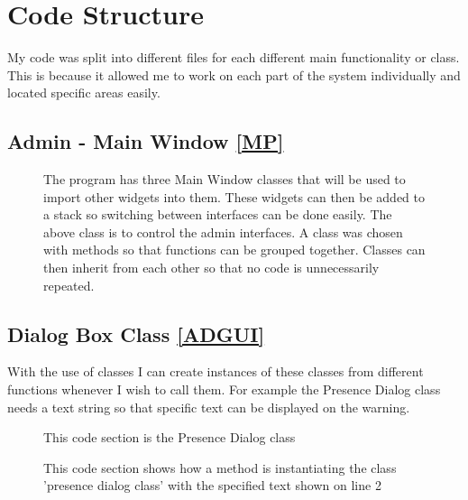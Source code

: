 \section{Code Structure}

My code was split into different files for each different main functionality or class. This is because it allowed me to work on each part of the system individually and located specific areas easily.

\subsection{Admin - Main Window \ref{MP}}
\begin{figure}[H]
    \caption{The program has three Main Window classes that will be used to import other widgets into them. These widgets can then be added to a stack so switching between interfaces can be done easily. The above class is to control the admin interfaces. A class was chosen with methods so that functions can be grouped together. Classes can then inherit from each other so that no code is unnecessarily repeated.} \label{fig:MainWindowAdmin}
\end{figure}

\newpage

\subsection{Dialog Box Class \ref{ADGUI}}
With the use of classes I can create instances of these classes from different functions whenever I wish to call them. For example the Presence Dialog class needs a text string so that specific text can be displayed on the warning.
\begin{figure}[H]
    \caption{This code section is the Presence Dialog class} \label{fig:Dialog Class}
\end{figure}

\begin{figure}[H]
    \caption{This code section shows how a method is instantiating the class 'presence dialog class' with the specified text shown on line 2} \label{fig:Dialog Class}
\end{figure}

